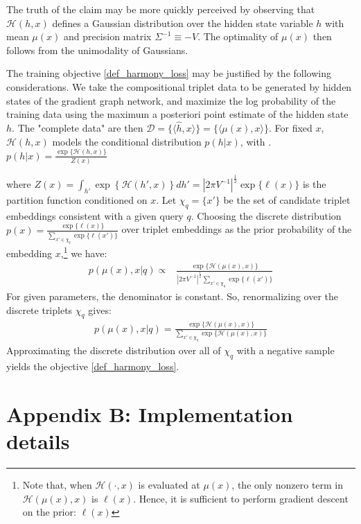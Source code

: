 \documentclass[a4paper,10pt]{article}
\begin{document}
The truth of the claim may be more quickly perceived by observing that $\mathcal{H}(h,x)$ defines a Gaussian distribution over the hidden state variable $h$ with mean $\mu(x)$ and precision matrix $\Sigma^{-1} \equiv -V$. The optimality of $\mu(x)$ then follows from the unimodality of Gaussians. 

The training objective \ref{def_harmony_loss} may be justified by the following considerations. We take the compositional triplet data to be generated by hidden states of the gradient graph network, and maximize the log probability of the training data using the maximum a posteriori point estimate of the hidden state $h$. The "complete data" are then $\mathcal{D} = \{ \langle \hat{h}, x\rangle \} = \{ \langle \mu(x), x \rangle \}$. For fixed $x$, $\mathcal{H}(h,x)$ models the conditional distribution $p(h|x)$, with 
\ex. $p(h|x) = \frac{\exp\{\mathcal{H}(h,x)\}}{Z(x)}$

where $Z(x) = \int_{h'} \exp \left\{\mathcal{H}(h',x)\right\} dh' = |2\pi V^{-1}|^{\frac{1}{2}}\exp\{\ell(x)\} $ is the partition function conditioned on $x$.
Let $\chi_q = \{x'\}$ be the set of candidate triplet embeddings consistent with a given query $q$. Choosing the discrete distribution $p(x) = \frac{\exp\{\ell(x)\} }{\sum_{x'\in \chi_q} \exp \{ \ell(x')\}}$ over triplet embeddings as the prior probability of the embedding $x$,\footnote{Note that, when $\mathcal{H}(\cdot,x)$ is evaluated at $\mu(x)$, the only nonzero term in $\mathcal{H}(\mu(x),x)$ is $\ell(x)$. Hence, it is sufficient to perform gradient descent on the prior: $\ell(x)$}
 we have:
\begin{align*}
p(\mu(x),x|q) \propto& \frac{\exp \{ \mathcal{H}(\mu(x),x)\} }{|2\pi V^{-1}|^{\frac{1}{2}}\sum_{x'\in \chi_q} \exp \{ \ell(x')\}} 
\end{align*}
For given parameters, the denominator is constant. So, renormalizing over the discrete triplets $\chi_q$ gives:
\begin{align*}
p(\mu(x),x|q) = \frac{\exp \{ \mathcal{H}(\mu(x),x)\} }{\sum_{x'\in \chi_q} \exp\{\mathcal{H}(\mu(x),x)\}}
\end{align*}
Approximating the discrete distribution over all of $\chi_q$ with a negative sample yields the objective \ref{def_harmony_loss}. 

\section{Appendix B: Implementation details}
\end{document}
